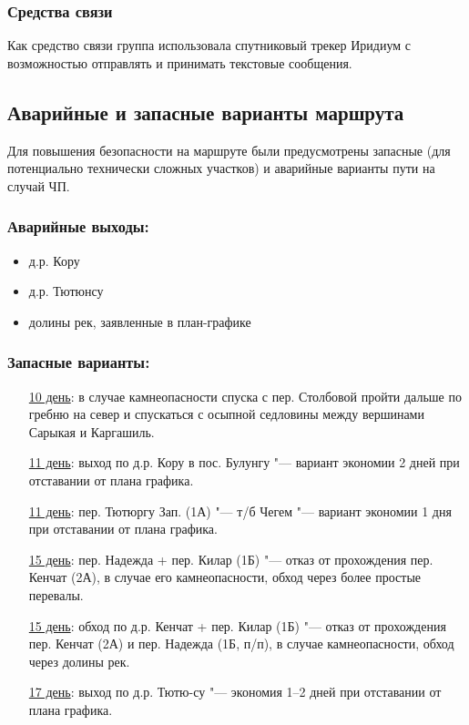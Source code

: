 		\subsubsection{Средства связи}
			Как средство связи группа использовала спутниковый трекер Иридиум с возможностью отправлять и принимать текстовые сообщения.

	\subsection{Аварийные и запасные варианты маршрута}
		Для повышения безопасности на маршруте были предусмотрены запасные (для потенциально технически сложных участков) и 
		аварийные варианты пути  на случай ЧП.

		\subsubsection*{Аварийные выходы:}
			\begin{itemize}
				\item д.р. Кору
				\item д.р. Тютюнсу
				\item долины рек, заявленные в план-графике
			\end{itemize}

		\subsubsection*{Запасные варианты:}
			\settowidth{\tmplen}{10 день: }
			\addtolength{\tmplen}{\leftmargin}
			\begin{enumerate}[leftmargin=\tmplen]
				\item[\uline{10 день}:] в случае камнеопасности спуска с пер. Столбовой пройти дальше по гребню на север и спускаться с осыпной седловины между вершинами Сарыкая и Каргашиль.
				\item[\uline{11 день}:] выход по д.р. Кору в пос. Булунгу "--- вариант экономии 2 дней при отставании от плана графика.
				\item[\uline{11 день}:] пер. Тютюргу Зап. (1А) "--- т/б Чегем "--- вариант экономии 1 дня при отставании от плана графика.
				\item[\uline{15 день}:] пер. Надежда + пер. Килар (1Б) "--- отказ от прохождения пер. Кенчат (2А), в случае его камнеопасности, обход через более простые перевалы.
				\item[\uline{15 день}:] обход по д.р. Кенчат + пер. Килар (1Б) "--- отказ от прохождения пер. Кенчат (2А) и пер. Надежда (1Б, п/п), в случае камнеопасности, обход через долины рек.
				\item[\uline{17 день}:] выход по д.р. Тютю-су "---  экономия 1--2 дней при отставании от плана графика.
			\end{enumerate}
